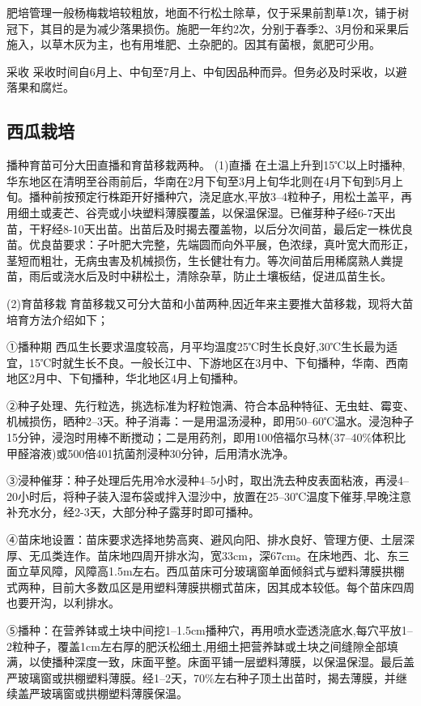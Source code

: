 \documentclass{ctexbook}
\begin{document}
肥培管理一般杨梅栽培较粗放，地面不行松土除草，仅于采果前割草1次，铺于树冠下，其目的是为减少落果损伤。施肥一年约2次，分别于春季2、3月份和采果后施入，以草木灰为主，也有用堆肥、土杂肥的。因其有菌根，氮肥可少用。

采收 采收时间自6月上、中旬至7月上、中旬因品种而异。但务必及时采收，以避落果和腐烂。
\subsection{西瓜栽培}
播种育苗可分大田直播和育苗移栽两种。
(1)直播 在土温上升到15℃以上时播种,华东地区在清明至谷雨前后，华南在2月下旬至3月上旬华北则在4月下旬到5月上旬。播种前按预定行株距开好播种穴，浇足底水,平放3--4粒种子，用松土盖平，再用细土或麦芒、谷壳或小块塑料薄膜覆盖，以保温保湿。已催芽种子经6-7天出苗，干籽经8-10天出苗。出苗后及时揭去覆盖物，以后分次间苗，最后定一株优良苗。优良苗要求：子叶肥大完整，先端圆而向外平展，色浓绿，真叶宽大而形正，茎短而粗壮，无病虫害及机械损伤，生长健壮有力。等次间苗后用稀腐熟人粪提苗，雨后或浇水后及时中耕松土，清除杂草，防止土壤板结，促进瓜苗生长。

(2)育苗移栽 育苗移栽又可分大苗和小苗两种,因近年来主要推大苗移栽，现将大苗培育方法介绍如下；

①播种期 西瓜生长要求温度较高，月平均温度25℃时生长良好,30℃生长最为适宜，15℃时就生长不良。一般长江中、下游地区在3月中、下旬播种，华南、西南地区2月中、下旬播种，华北地区4月上旬播种。

②种子处理、先行粒选，挑选标准为籽粒饱满、符合本品种特征、无虫蛀、霉变、机械损伤，晒种2--3天。种子消毒：一是用温汤浸种，即用50--60℃温水。浸泡种子15分钟，浸泡时用棒不断搅动；二是用药剂，即用100倍福尔马林(37--40\%体积比甲醛溶液)或500倍401抗菌剂浸种30分钟，后用清水洗净。

③浸种催芽：种子处理后先用冷水浸种4--5小时，取出洗去种皮表面粘液，再浸4--20小时后，将种子装入湿布袋或拌入湿沙中，放置在25--30℃温度下催芽,早晚注意补充水分，经2-3天，大部分种子露芽时即可播种。

④苗床地设置：苗床要求选择地势高爽、避风向阳、排水良好、管理方便、土层深厚、无瓜类连作。苗床地四周开排水沟，宽33cm，深67cm。在床地西、北、东三面立草风障，风障高1.5m左右。西瓜苗床可分玻璃窗单面倾斜式与塑料薄膜拱棚式两种，目前大多数瓜区是用塑料薄膜拱棚式苗床，因其成本较低。每个苗床四周也要开沟，以利排水。

⑤播种：在营养钵或土块中间挖1--1.5cm播种穴，再用喷水壶透浇底水,每穴平放1--2粒种子，覆盖1cm左右厚的肥沃松细土,用细土把营养缽或土块之间缝隙全部填满，以使播种深度一致，床面平整。床面平铺一层塑料薄膜，以保温保湿。最后盖严玻璃窗或拱棚塑料薄膜。经1--2天，70\%左右种子顶土出苗时，揭去薄膜，并继续盖严玻璃窗或拱棚塑料薄膜保温。
\end{document}
